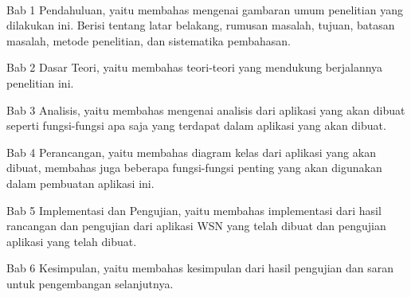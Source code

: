 \paragraph{}
Bab 1 Pendahuluan, yaitu membahas mengenai gambaran umum penelitian yang dilakukan ini. Berisi tentang latar belakang, rumusan masalah, tujuan, batasan masalah, metode penelitian, dan sistematika pembahasan.


Bab 2 Dasar Teori, yaitu membahas teori-teori yang mendukung berjalannya penelitian ini. 


Bab 3 Analisis, yaitu membahas mengenai analisis dari aplikasi yang akan dibuat seperti fungsi-fungsi apa saja yang terdapat dalam aplikasi yang akan dibuat.


Bab 4 Perancangan, yaitu membahas diagram kelas dari aplikasi yang akan dibuat, membahas juga beberapa fungsi-fungsi penting yang akan digunakan dalam pembuatan aplikasi ini.


Bab 5 Implementasi dan Pengujian, yaitu membahas implementasi dari hasil rancangan dan pengujian dari aplikasi WSN yang telah dibuat dan pengujian aplikasi yang telah dibuat.


Bab 6 Kesimpulan, yaitu membahas kesimpulan dari hasil pengujian dan saran untuk pengembangan selanjutnya.